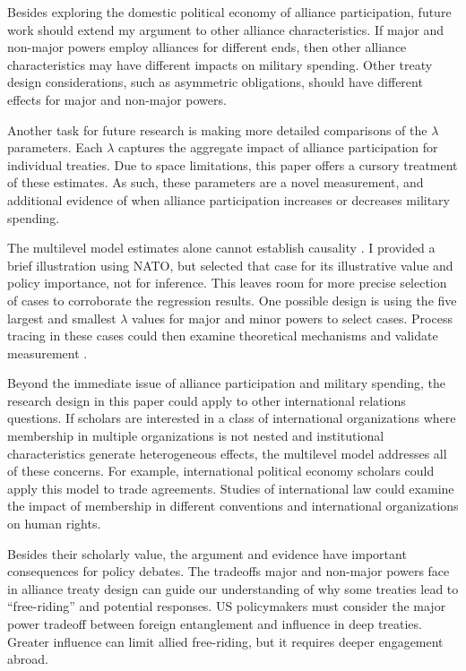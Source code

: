 \documentclass[12pt]{article}
\begin{document}
Besides exploring the domestic political economy of alliance participation, future work should extend my argument to other alliance characteristics. 
If major and non-major powers employ alliances for different ends, then other alliance characteristics may have different impacts on military spending. 
Other treaty design considerations, such as asymmetric obligations, should have different effects for major and non-major powers. 


Another task for future research is making more detailed comparisons of the $\lambda$ parameters. 
Each $\lambda$ captures the aggregate impact of alliance participation for individual treaties.
Due to space limitations, this paper offers a cursory treatment of these estimates. 
As such, these parameters are a novel measurement, and additional evidence of when alliance participation increases or decreases military spending. 


The multilevel model estimates alone cannot establish causality \citep{Seawright2016}. 
I provided a brief illustration using NATO, but selected that case for its illustrative value and policy importance, not for inference. 
This leaves room for more precise selection of cases to corroborate the regression results. 
One possible design is using the five largest and smallest $\lambda$ values for major and minor powers to select cases. 
Process tracing in these cases could then examine theoretical mechanisms and validate measurement \citep{Seawright2016}. 


Beyond the immediate issue of alliance participation and military spending, the research design in this paper could apply to other international relations questions.
If scholars are interested in a class of international organizations where membership in multiple organizations is not nested and institutional characteristics generate heterogeneous effects, the multilevel model addresses all of these concerns.
For example, international political economy scholars could apply this model to trade agreements. 
Studies of international law could examine the impact of membership in different conventions and international organizations on human rights. 


Besides their scholarly value, the argument and evidence have important consequences for policy debates. 
The tradeoffs major and non-major powers face in alliance treaty design can guide our understanding of why some treaties lead to ``free-riding'' and potential responses. 
US policymakers must consider the major power tradeoff between foreign entanglement and influence in deep treaties. 
Greater influence can limit allied free-riding, but it requires deeper engagement abroad. 
\end{document}

